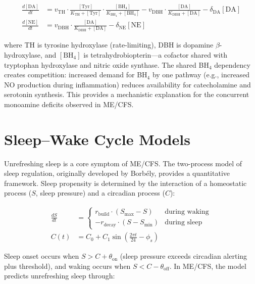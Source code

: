 \begin{align}
\label{eq:catecholamines}
\frac{d[\text{DA}]}{dt} &= v_{\text{TH}} \cdot \frac{[\text{Tyr}]}{K_{\text{TH}} + [\text{Tyr}]} \cdot \frac{[\text{BH}_4]}{K_{\text{BH}_4} + [\text{BH}_4]} - v_{\text{DBH}} \cdot \frac{[\text{DA}]}{K_{\text{DBH}} + [\text{DA}]} - \delta_{\text{DA}} [\text{DA}] \\
\frac{d[\text{NE}]}{dt} &= v_{\text{DBH}} \cdot \frac{[\text{DA}]}{K_{\text{DBH}} + [\text{DA}]} - \delta_{\text{NE}} [\text{NE}]
\end{align}

where TH is tyrosine hydroxylase (rate-limiting), DBH is dopamine $\beta$-hydroxylase, and $[\text{BH}_4]$ is tetrahydrobiopterin---a cofactor shared with tryptophan hydroxylase and nitric oxide synthase. The shared BH$_4$ dependency creates competition: increased demand for BH$_4$ by one pathway (e.g., increased NO production during inflammation) reduces availability for catecholamine and serotonin synthesis. This provides a mechanistic explanation for the concurrent monoamine deficits observed in ME/CFS.

\section{Sleep--Wake Cycle Models}
\label{sec:sleep-wake-models}

Unrefreshing sleep is a core symptom of ME/CFS. The two-process model of sleep regulation, originally developed by Borb\'{e}ly, provides a quantitative framework. Sleep propensity is determined by the interaction of a homeostatic process ($S$, sleep pressure) and a circadian process ($C$):

\begin{align}
\label{eq:sleep-wake}
\frac{dS}{dt} &= \begin{cases} r_{\text{build}} \cdot (S_{\max} - S) & \text{during waking} \\ -r_{\text{decay}} \cdot (S - S_{\min}) & \text{during sleep} \end{cases} \\
C(t) &= C_0 + C_1 \sin\left(\frac{2\pi t}{24} - \phi_s\right)
\end{align}

Sleep onset occurs when $S > C + \theta_{\text{on}}$ (sleep pressure exceeds circadian alerting plus threshold), and waking occurs when $S < C - \theta_{\text{off}}$. In ME/CFS, the model predicts unrefreshing sleep through:

